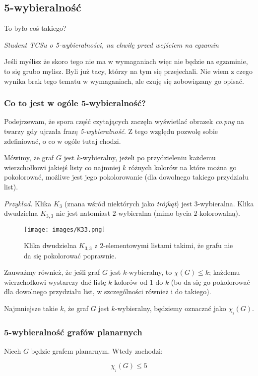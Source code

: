             \subsection{5-wybieralność}
            \epigraph{To było coś takiego?}{\textit{Student TCSu o 5-wybieralności, na chwilę przed wejściem na egzamin}}
            Jeśli myślisz że skoro tego nie ma w wymaganiach więc nie będzie na egzaminie, to się grubo mylisz. Byli już tacy, którzy na tym się przejechali. Nie wiem z czego wynika brak tego tematu w wymaganiach, ale czuję się zobowiązany go opisać. 

            \subsubsection{Co to jest w ogóle 5-wybieralność?}
            Podejrzewam, że spora część czytających zaczęła wyświetlać obrazek \textit{co.png} na twarzy gdy ujrzała frazę \textit{5-wybieralność}. Z tego względu pozwolę sobie zdefiniować, o co w ogóle tutaj chodzi. 

            Mówimy, że graf $G$ jest $k$-wybieralny, jeżeli po przydzieleniu każdemu wierzchołkowi jakiejś listy co najmniej $k$ różnych kolorów na które można go pokolorować, możliwe jest jego pokolorowanie (dla dowolnego takiego przydziału list). 
            
            \textit{Przykład.} Klika $K_3$ (znana wśród niektórych jako \textit{trójkąt}) jest 3-wybieralna. Klika dwudzielna $K_{3,3}$ nie jest natomiast $2$-wybieralna (mimo bycia $2$-kolorowalną). 

            \begin{figure}[H]
                \centering
                \texttt{[image: images/K33.png]}
                \caption{Klika dwudzielna $K_{3,3}$ z $2$-elementowymi listami takimi, że grafu nie da się pokolorować poprawnie.}
            \end{figure}

            Zauważmy również, że jeśli graf $G$ jest $k$-wybieralny, to $\chi(G) \leq k$; każdemu wierzchołkowi wystarczy dać listę $k$ kolorów od $1$ do $k$ (bo da się go pokolorować dla dowolnego przydziału list, w szczególności również i do takiego). 

            Najmniejsze takie $k$, że graf $G$ jest $k$-wybieralny, będziemy oznaczać jako $\chi_{_l}(G)$.

            \subsubsection{5-wybieralność grafów planarnych}
            Niech $G$ będzie grafem planarnym. Wtedy zachodzi:
            \begin{theorem}{
                \begin{equation} 
                    \chi_{_l}(G) \leq 5
                \end{equation}
            }               
            \end{theorem}

